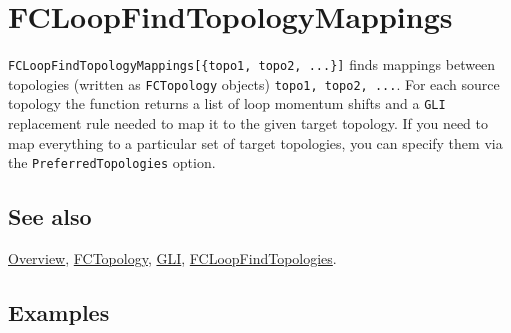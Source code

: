 \documentclass[../FeynCalcManual.tex]{subfiles}
\begin{document}
\hypertarget{fcloopfindtopologymappings}{
\section{FCLoopFindTopologyMappings}\label{fcloopfindtopologymappings}}

\texttt{FCLoopFindTopologyMappings[\allowbreak{}\{\allowbreak{}topo1,\ \allowbreak{}topo2,\ \allowbreak{}...\}]}
finds mappings between topologies (written as \texttt{FCTopology}
objects) \texttt{topo1,\ \allowbreak{}topo2,\ \allowbreak{}...}. For
each source topology the function returns a list of loop momentum shifts
and a \texttt{GLI} replacement rule needed to map it to the given target
topology. If you need to map everything to a particular set of target
topologies, you can specify them via the \texttt{PreferredTopologies}
option.

\subsection{See also}

\hyperlink{toc}{Overview}, \hyperlink{fctopology}{FCTopology},
\hyperlink{gli}{GLI},
\hyperlink{fcloopfindtopologies}{FCLoopFindTopologies}.

\subsection{Examples}
\end{document}
